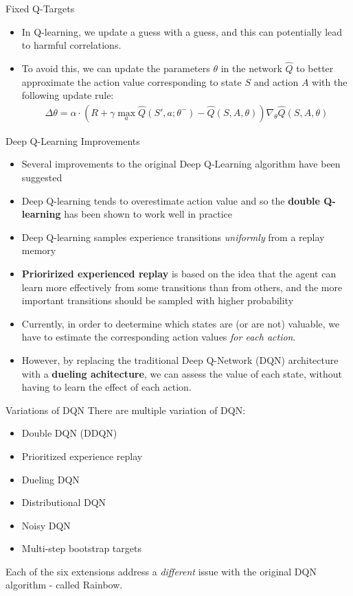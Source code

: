 \documentclass[10pt,mathserif]{beamer}
\begin{document}
\begin{frame}{Fixed Q-Targets}
\begin{itemize}
\item In Q-learning, we update a guess with a guess, and this can potentially lead to harmful correlations.
\item To avoid this, we can update the parameters $\theta$ in the network $\hat{Q}$ to better approximate the action value corresponding to state $S$ and action $A$ with the following update rule:
\begin{align}\nonumber
\Delta\theta = \alpha\cdot(R+\gamma\max_a\hat{Q}(S',a;\theta^-) - \hat{Q}(S,A,\theta))\nabla_{\theta}\hat{Q}(S,A,\theta)	
\end{align}
\end{itemize}
\end{frame}

\begin{frame}{Deep Q-Learning Improvements}
\begin{itemize}
\item Several improvements to the original Deep Q-Learning algorithm have been suggested
\item Deep Q-learning tends to overestimate action value and so the \textbf{double Q-learning} has been shown to work well in practice
\item Deep Q-learning samples experience transitions \textit{uniformly} from a replay memory
\item \textbf{Priorirized experienced replay} is based on the idea that the agent can learn more effectively from
some transitions than from others, and the more important transitions should be sampled with higher probability
\item Currently, in order to deetermine which states are (or are not) valuable, we have to estimate the corresponding action values \textit{for each action}.
\item However, by replacing the traditional Deep Q-Network (DQN) architecture with a \textbf{dueling achitecture}, we can assess the value of each state, without having to learn the effect of each action.
\end{itemize}
\end{frame}


\begin{frame}{Variations of DQN}
There are multiple variation of DQN:
\begin{itemize}
\item Double DQN (DDQN)
\item Prioritized experience replay
\item Dueling DQN
\item Distributional DQN
\item Noisy DQN
\item Multi-step bootstrap targets
\end{itemize}
Each of the six extensions address a \textit{different} issue with the original DQN algorithm - called Rainbow.
\end{frame}
\end{document}

